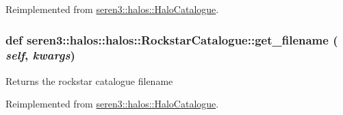 Reimplemented from \hyperlink{classseren3_1_1halos_1_1HaloCatalogue}{seren3::halos::HaloCatalogue}.\hypertarget{classseren3_1_1halos_1_1halos_1_1RockstarCatalogue_ab55aae49df70e416fba591c9682c264b}{
\subsubsection[{get\_\-filename}]{\setlength{\rightskip}{0pt plus 5cm}def seren3::halos::halos::RockstarCatalogue::get\_\-filename ( {\em self}, \/   {\em kwargs})}}
\label{classseren3_1_1halos_1_1halos_1_1RockstarCatalogue_ab55aae49df70e416fba591c9682c264b}
\begin{DoxyVerb}
Returns the rockstar catalogue filename
\end{DoxyVerb}
 

Reimplemented from \hyperlink{classseren3_1_1halos_1_1HaloCatalogue}{seren3::halos::HaloCatalogue}.

